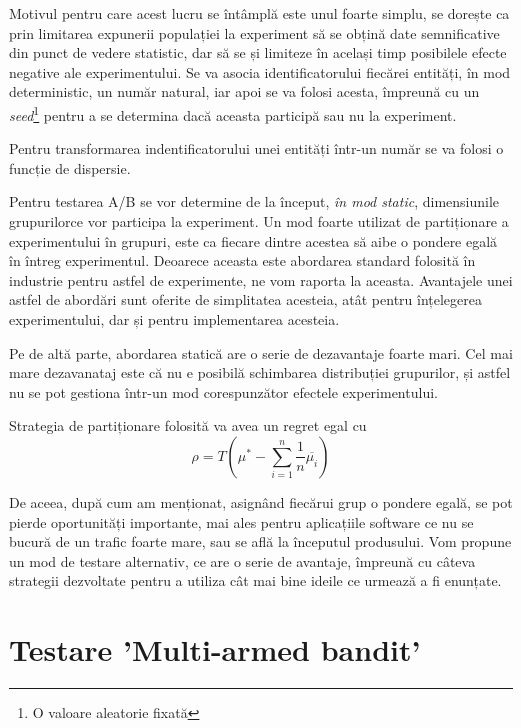 Motivul pentru care acest lucru se întâmplă este unul foarte simplu, se dorește ca prin limitarea expunerii populației la experiment să se obțină date semnificative din punct de vedere statistic, dar să se și limiteze în același timp posibilele efecte negative ale experimentului. Se va asocia identificatorului fiecărei entități, în mod deterministic, un număr natural, iar apoi se va folosi acesta, împreună cu un \textit{seed}\footnote{O valoare aleatorie fixată} pentru a se determina dacă aceasta participă sau nu la experiment.

\begin{remark}
	Pentru transformarea indentificatorului unei entități într-un număr se va folosi o funcție de dispersie.
\end{remark}

Pentru testarea A/B se vor determine de la început, \textit{în mod static}, dimensiunile grupurilorce vor participa la experiment. Un mod foarte utilizat de partiționare a experimentului în grupuri, este ca fiecare dintre acestea să aibe o pondere egală în întreg experimentul. Deoarece aceasta este abordarea standard folosită în industrie pentru astfel de experimente, ne vom raporta la aceasta. Avantajele unei astfel de abordări sunt oferite de simplitatea acesteia, atât pentru înțelegerea experimentului, dar și pentru implementarea acesteia.

Pe de altă parte, abordarea statică are o serie de dezavantaje foarte mari. Cel mai mare dezavanataj este că nu e posibilă schimbarea distribuției grupurilor, și astfel nu se pot gestiona într-un mod corespunzător efectele experimentului. 

\begin{remark}
	Strategia de partiționare folosită va avea un regret egal cu
	\[
	\rho = T ( \mu^*  - \sum_{i = 1}^{n} \frac{1}{n} \overline{\mu_i})
	\]
\end{remark}

De aceea, după cum am menționat, asignând fiecărui grup o pondere egală, se pot pierde oportunități importante, mai ales pentru aplicațiile software ce nu se bucură de un trafic foarte mare, sau se află la începutul produsului. Vom propune un mod de testare alternativ, ce are o serie de avantaje, împreună cu câteva strategii dezvoltate pentru a utiliza cât mai bine ideile ce urmează a fi enunțate.

\section{Testare 'Multi-armed bandit'}

